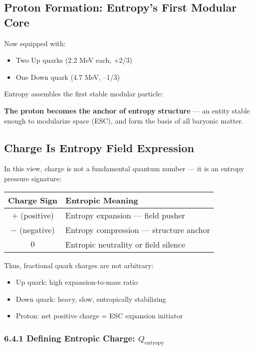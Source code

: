 \documentclass[12pt]{article}
\begin{document}
\subsection{Proton Formation: Entropy’s First Modular Core}

Now equipped with:
\begin{itemize}
    \item Two Up quarks (2.2 MeV each, +2/3)
    \item One Down quark (4.7 MeV, –1/3)
\end{itemize}

Entropy assembles the first stable modular particle:

\noindent
\textbf{The proton becomes the anchor of entropy structure} — an entity stable enough to modularize space (ESC), and form the basis of all baryonic matter.

\subsection{Charge Is Entropy Field Expression}

In this view, charge is not a fundamental quantum number — it is an entropy pressure signature:

\vspace{0.5em}
\begin{center}
\begin{tabular}{|c|p{10cm}|}
\hline
\textbf{Charge Sign} & \textbf{Entropic Meaning} \\
\hline
$+$ (positive) & Entropy expansion — field pusher \\
\hline
$-$ (negative) & Entropy compression — structure anchor \\
\hline
$0$ & Entropic neutrality or field silence \\
\hline
\end{tabular}
\end{center}
\vspace{0.5em}

Thus, fractional quark charges are not arbitrary:
\begin{itemize}
    \item Up quark: high expansion-to-mass ratio
    \item Down quark: heavy, slow, entropically stabilizing
    \item Proton: net positive charge = ESC expansion initiator
\end{itemize}

\subsubsection*{6.4.1 Defining Entropic Charge: $Q_{\text{entropy}}$}
\end{document}
